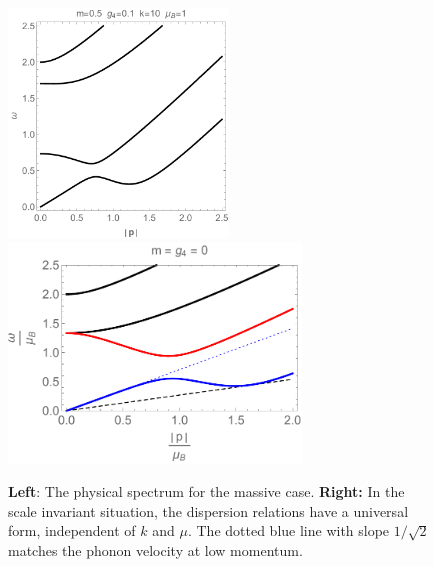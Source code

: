 \begin{figure}[h]
\begin{center}
\includegraphics[width=2.3in]{Chapter_3_Folder_1806.06976/figures/spectrummassive.pdf}\hspace{0.3in}\includegraphics[height=2.3in]{Chapter_3_Folder_1806.06976/figures/spectrumcrit.pdf}
\end{center}
\caption{ \small{{\bf Left}: The physical spectrum for the massive case. {\bf Right:} In the scale invariant situation, the dispersion relations have a universal form, independent of $k$ and $\mu$. The dotted blue line with slope $1/\sqrt 2$ matches the phonon velocity at low momentum.
}}
\label{spectmassive}
\end{figure}
